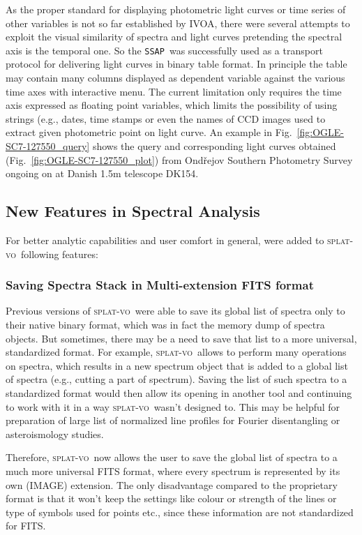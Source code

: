 \documentclass[final,authoryear,5p,times,twocolumn]{elsarticle}
\newcommand{\ssap}{\texttt{SSAP}}
\newcommand{\splatvo}{\textsc{splat-vo}}
\begin{document}
As the proper standard for displaying photometric light curves or time series
of other variables is not so far established by IVOA, there were several
attempts to exploit the visual similarity of spectra and light curves
pretending the spectral axis is the temporal one.  So the \ssap\ was
successfully used as a transport protocol for delivering light curves in
binary table format. In principle the table may contain many columns displayed
as dependent variable against the various time axes with interactive menu.
The current limitation only requires the time axis expressed as floating point
variables, which limits the possibility of using strings (e.g., dates, time
stamps or even the names of CCD images used to extract given photometric point
on light curve.  An example in Fig.~\ref{fig:OGLE-SC7-127550_query} shows the
query and corresponding light curves obtained  (Fig.~\ref{fig:OGLE-SC7-127550_plot})  from
Ond\v{r}ejov Southern Photometry Survey \citep{skoda_adassxxiii} ongoing on
at Danish 1.5m telescope DK154.

\subsection{New Features in Spectral Analysis}

\label{davids_functions}
For better analytic capabilities and user comfort in
general, were added \citep{and146bcthesis} to \splatvo\ following features:

\subsubsection{Saving Spectra Stack in Multi-extension FITS format}

Previous versions of \splatvo\ were able to save its global list of spectra only to
their native binary format, which was in fact the memory dump of spectra
objects. But sometimes, there may be a need to save that list to a more
universal, standardized format. For example, \splatvo\ allows to perform many
operations on spectra, which results in a new spectrum object that is added to
a global list of spectra (e.g., cutting a part of spectrum). Saving the list of
such spectra to a standardized format would then allow its opening in another
tool and continuing to work with it in a way \splatvo\ wasn't designed to.
This may be helpful for preparation of large list of normalized line profiles
for Fourier disentangling or asteroismology studies.

Therefore, \splatvo\ now allows the user to save the global list of spectra to a
much more universal FITS format, where every spectrum  is represented by its
own (IMAGE) extension.  The only disadvantage compared to the proprietary
format is that it won't keep the settings like colour or strength of the lines
or type of symbols used for points etc., since these information  are not
standardized for FITS.
\end{document}
